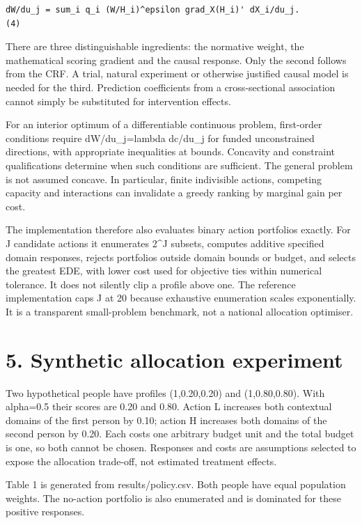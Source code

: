 \documentclass[11pt,a4paper]{article}
\begin{document}
{\footnotesize\begin{verbatim}
dW/du_j = sum_i q_i (W/H_i)^epsilon grad_X(H_i)' dX_i/du_j.             (4)
\end{verbatim}}
There are three distinguishable ingredients: the normative weight, the mathematical scoring gradient and the causal response. Only the second follows from the CRF. A trial, natural experiment or otherwise justified causal model is needed for the third. Prediction coefficients from a cross-sectional association cannot simply be substituted for intervention effects.

For an interior optimum of a differentiable continuous problem, first-order conditions require dW/du\_j=lambda dc/du\_j for funded unconstrained directions, with appropriate inequalities at bounds. Concavity and constraint qualifications determine when such conditions are sufficient. The general problem is not assumed concave. In particular, finite indivisible actions, competing capacity and interactions can invalidate a greedy ranking by marginal gain per cost.

The implementation therefore also evaluates binary action portfolios exactly. For J candidate actions it enumerates 2\textasciicircum{}J subsets, computes additive specified domain responses, rejects portfolios outside domain bounds or budget, and selects the greatest EDE, with lower cost used for objective ties within numerical tolerance. It does not silently clip a profile above one. The reference implementation caps J at 20 because exhaustive enumeration scales exponentially. It is a transparent small-problem benchmark, not a national allocation optimiser.

\section*{5. Synthetic allocation experiment}
Two hypothetical people have profiles (1,0.20,0.20) and (1,0.80,0.80). With alpha=0.5 their scores are 0.20 and 0.80. Action L increases both contextual domains of the first person by 0.10; action H increases both domains of the second person by 0.20. Each costs one arbitrary budget unit and the total budget is one, so both cannot be chosen. Responses and costs are assumptions selected to expose the allocation trade-off, not estimated treatment effects.

Table 1 is generated from results/policy.csv. Both people have equal population weights. The no-action portfolio is also enumerated and is dominated for these positive responses.
\end{document}
